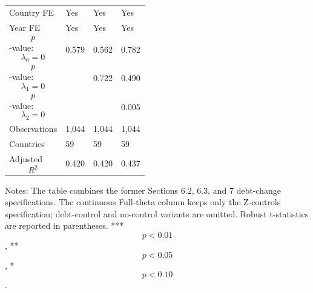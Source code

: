 \begin{table}[H]
\begin{threeparttable}
\begin{tabularx}{\textwidth}{lYYY}
Country FE & Yes & Yes & Yes \\
Year FE & Yes & Yes & Yes \\
$$p$$-value: $$\lambda_0=0$$ & 0.579 & 0.562 & 0.782 \\
$$p$$-value: $$\lambda_1=0$$ &  & 0.722 & 0.490 \\
$$p$$-value: $$\lambda_2=0$$ &  &  & 0.005 \\
Observations & 1,044 & 1,044 & 1,044 \\
Countries & 59 & 59 & 59 \\
Adjusted $$R^2$$ & 0.420 & 0.420 & 0.437 \\
\bottomrule
\end{tabularx}
\begin{tablenotes}[flushleft]\footnotesize
\item Notes: The table combines the former Sections 6.2, 6.3, and 7 debt-change specifications. The continuous Full-theta column keeps only the Z-controls specification; debt-control and no-control variants are omitted. Robust t-statistics are reported in parentheses. *** $$p<0.01$$, ** $$p<0.05$$, * $$p<0.10$$.
\end{tablenotes}
\end{threeparttable}
\end{table}
